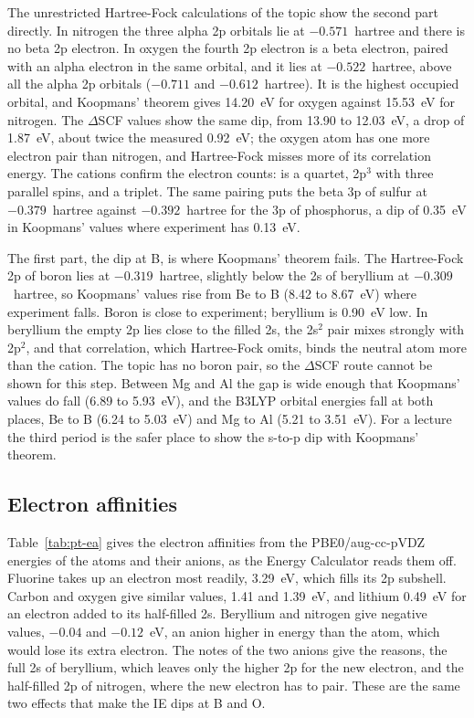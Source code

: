 The unrestricted Hartree-Fock calculations of the topic  show the second part directly. In nitrogen the three alpha 2p orbitals lie at $-0.571$~hartree and there is no beta 2p electron. In oxygen the fourth 2p electron is a beta electron, paired with an alpha electron in the same orbital, and it lies at $-0.522$~hartree, above all the alpha 2p orbitals ($-0.711$ and $-0.612$~hartree). It is the highest occupied orbital, and Koopmans' theorem gives 14.20~eV for oxygen against 15.53~eV for nitrogen. The $\Delta$SCF values show the same dip, from 13.90 to 12.03~eV, a drop of 1.87~eV, about twice the measured 0.92~eV; the oxygen atom has one more electron pair than nitrogen, and Hartree-Fock misses more of its correlation energy. The cations confirm the electron counts:  is a quartet, 2p$^3$ with three parallel spins, and  a triplet. The same pairing puts the beta 3p of sulfur at $-0.379$~hartree against $-0.392$~hartree for the 3p of phosphorus, a dip of 0.35~eV in Koopmans' values where experiment has 0.13~eV.

The first part, the dip at B, is where Koopmans' theorem fails. The Hartree-Fock 2p of boron lies at $-0.319$~hartree, slightly below the 2s of beryllium at $-0.309$~hartree, so Koopmans' values rise from Be to B (8.42 to 8.67~eV) where experiment falls. Boron is close to experiment; beryllium is 0.90~eV low. In beryllium the empty 2p lies close to the filled 2s, the 2s$^2$ pair mixes strongly with 2p$^2$, and that correlation, which Hartree-Fock omits, binds the neutral atom more than the cation. The topic  has no boron pair, so the $\Delta$SCF route cannot be shown for this step. Between Mg and Al the gap is wide enough that Koopmans' values do fall (6.89 to 5.93~eV), and the B3LYP orbital energies fall at both places, Be to B (6.24 to 5.03~eV) and Mg to Al (5.21 to 3.51~eV). For a lecture the third period is the safer place to show the s-to-p dip with Koopmans' theorem.

\subsection{Electron affinities}
Table~\ref{tab:pt-ea} gives the electron affinities from the PBE0/aug-cc-pVDZ energies of the atoms and their anions, as the Energy Calculator reads them off. Fluorine takes up an electron most readily, 3.29~eV, which fills its 2p subshell. Carbon and oxygen give similar values, 1.41 and 1.39~eV, and lithium 0.49~eV for an electron added to its half-filled 2s. Beryllium and nitrogen give negative values, $-0.04$ and $-0.12$~eV, an anion higher in energy than the atom, which would lose its extra electron. The notes of the two anions give the reasons, the full 2s of beryllium, which leaves only the higher 2p for the new electron, and the half-filled 2p of nitrogen, where the new electron has to pair. These are the same two effects that make the IE dips at B and O.

